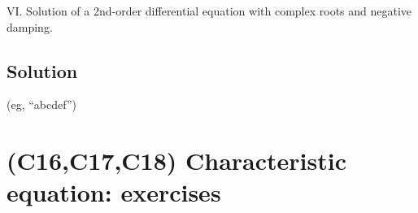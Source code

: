 VI. Solution of a 2nd-order differential equation with complex roots and negative damping.

\subsection*{Solution}
(eg, ``abcdef'')





%
%
%
%
%
%
%
%
%




\newpage
\section{(C16,C17,C18) Characteristic equation: exercises}


